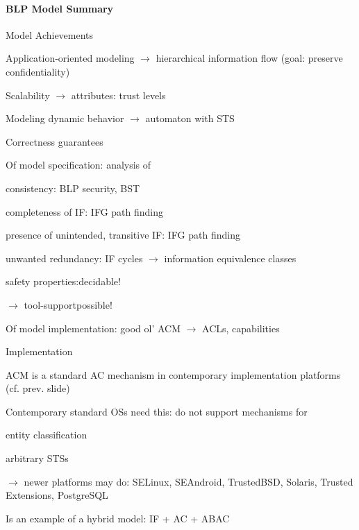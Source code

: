 \documentclass[a4paper]{article}
\begin{document}
\begin{multicols}{3}
    \paragraph{BLP Model Summary}
    Model Achievements
    \begin{itemize*}
        \item Application-oriented modeling $\rightarrow$ hierarchical information flow (goal: preserve confidentiality)
        \item Scalability $\rightarrow$ attributes: trust levels
        \item Modeling dynamic behavior $\rightarrow$ automaton with STS
        \item Correctness guarantees
        \begin{itemize*}
            \item Of model specification: analysis of
            \begin{itemize*}
                \item consistency: BLP security, BST
                \item completeness of IF: IFG path finding
                \item presence of unintended, transitive IF: IFG path finding
                \item unwanted redundancy: IF cycles $\rightarrow$ information equivalence classes
                \item safety properties:decidable!
                \item $\rightarrow$ tool-supportpossible!
            \end{itemize*}
            \item Of model implementation: good ol’ ACM $\rightarrow$ ACLs, capabilities
        \end{itemize*}
        \item Implementation
        \begin{itemize*}
            \item ACM is a standard AC mechanism in contemporary implementation platforms (cf. prev. slide)
            \item Contemporary standard OSs need this: do not support mechanisms for
            \begin{itemize*}
                \item entity classification
                \item arbitrary STSs
            \end{itemize*}
            \item $\rightarrow$ newer platforms may do: SELinux, SEAndroid, TrustedBSD, Solaris, Trusted Extensions, PostgreSQL
        \end{itemize*}
        \item Is an example of a hybrid model: IF + AC + ABAC
    \end{itemize*}


\end{multicols}
\end{document}
